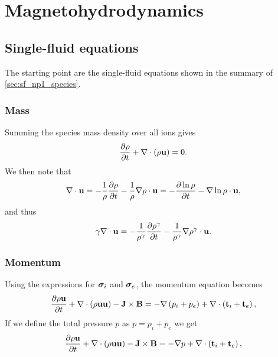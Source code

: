 \documentclass[a4paper,11pt]{report}
\begin{document}
\chapter{Magnetohydrodynamics}
\section{Single-fluid equations}
The starting point are the single-fluid equations shown in the summary of \cref{sec:sf_np1_species}. 

\subsection{Mass}

Summing the species mass density over all ions gives
\begin{equation}
    \frac{\partial \rho}{\partial t} + \nabla \cdot \left( \rho \mathbf{u} \right) = 0.
\end{equation}
We then note that
\begin{equation*}
    \nabla \cdot \mathbf{u} = -\frac{1}{\rho} \frac{\partial \rho}{\partial t} - \frac{1}{\rho} \nabla \rho \cdot \mathbf{u} = - \frac{\partial \ln{\rho} }{\partial t} -  \nabla \ln{\rho} \cdot \mathbf{u},
\end{equation*}
and thus
\begin{equation}
    \label{eq:mhd_div_trick}
    \gamma \nabla \cdot \mathbf{u} = -\frac{1}{\rho^\gamma} \frac{\partial \rho^\gamma}{\partial t} - \frac{1}{\rho^\gamma} \nabla \rho^\gamma \cdot \mathbf{u}.
\end{equation}

\subsection{Momentum}

Using the expressions for $\bm \sigma_i$ and $\bm \sigma_e$, the momentum equation becomes
\begin{equation*}
    \frac{\partial \rho \mathbf{u}}{\partial t} + \nabla \cdot \left( \rho \mathbf{u} \mathbf{u} \right) - \mathbf{J} \times \mathbf{B} = -\nabla \left(  p_i + p_e \right) + \nabla \cdot \left(  \mathbf{t}_i + \mathbf{t}_e \right),
\end{equation*}
If we define the total pressure $p$ as $p = p_i + p_e$ we get
\begin{equation*}
    \frac{\partial \rho \mathbf{u}}{\partial t} + \nabla \cdot \left( \rho \mathbf{u} \mathbf{u} \right) - \mathbf{J} \times \mathbf{B} = -\nabla p + \nabla \cdot \left(  \mathbf{t}_i + \mathbf{t}_e \right),
\end{equation*}
\end{document}
